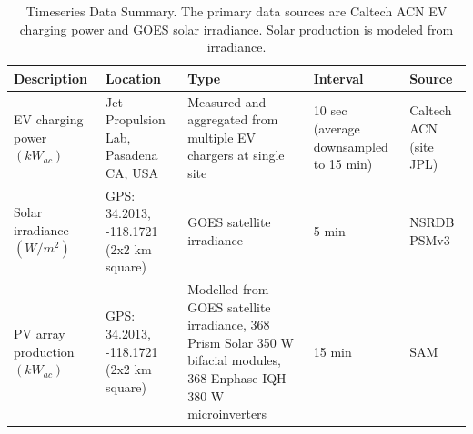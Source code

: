 \documentclass[journal,article,submit,pdftex,moreauthors]{Definitions/mdpi}
\begin{document}

\begin{table}[!h]
  \caption{Timeseries Data Summary. The primary data sources are Caltech ACN EV charging power and GOES solar irradiance. Solar production is modeled from irradiance.}
  \label{tab:data-summary}
  \begin{tabularx}{\linewidth}{XXXXX}
    \toprule
    Description                     & Location                                & Type                                                                                                                  & Interval                               & Source                                \\
    \midrule
    EV charging power $(kW_{ac})$   & Jet Propulsion Lab, Pasadena CA, USA    & Measured and aggregated from multiple  EV chargers at single site                                                     & 10 sec (average downsampled to 15 min) & Caltech ACN (site JPL) \cite{Lee2021} \\
    Solar irradiance $(W/m^2)$      & GPS: 34.2013, -118.1721 (2x2 km square) & GOES satellite irradiance                                                                                             & 5 min                                  & NSRDB PSMv3 \cite{Sengupta2018}       \\
    PV array production $(kW_{ac})$ & GPS: 34.2013, -118.1721 (2x2 km square) & Modelled from GOES satellite irradiance, 368 Prism Solar 350 W bifacial modules, 368 Enphase IQH 380 W microinverters & 15 min                                 & SAM \cite{NREL2022}                   \\
    \bottomrule
  \end{tabularx}
\end{table}
\end{document}
